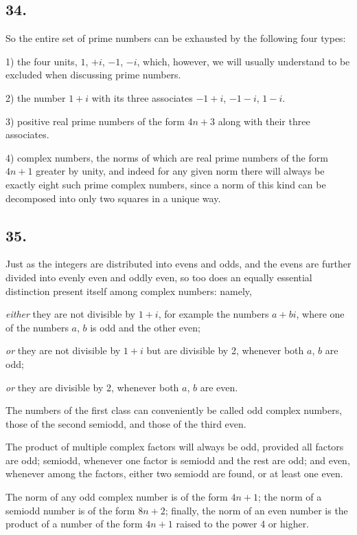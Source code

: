 \documentclass[twoside,12pt, showframe]{memoir}
\begin{document}
\subsection*{34.}

So the entire set of prime numbers can be exhausted by the following four types:

1) the four units, \(1\), \(+i\), \(-1\), \(-i\), which, however, we will usually understand to be excluded when discussing prime numbers.

2) the number \(1+i\) with its three associates \(-1+i\), \(-1-i\), \(1-i\).

3) positive real prime numbers of the form \(4n+3\) along with their three associates.

4) complex numbers, the norms of which are real prime numbers of the form \(4n+1\) greater by unity, and indeed for any given norm there will always be exactly eight such prime complex numbers, since a norm of this kind can be decomposed into only two squares in a unique way.
%

\subsection*{35.}

Just as the integers are distributed into evens and odds, and the evens are further divided into evenly even and oddly even, so too does an equally essential distinction present itself among complex numbers: namely,

\textit{either} they are not divisible by \(1+i\), for example the numbers \(a+bi\), where one of the numbers \(a\), \(b\) is odd and the other even;

\textit{or} they are not divisible by \(1+i\) but are divisible by 2, whenever both \(a\), \(b\) are odd;

\textit{or} they are divisible by 2, whenever both \(a\), \(b\) are even.

The numbers of the first class can conveniently be called odd complex numbers, those of the second semiodd, and those of the third even.

The product of multiple complex factors will always be odd, provided all factors are odd; semiodd, whenever one factor is semiodd and the rest are odd; and even, whenever among the factors, either two semiodd are found, or at least one even.

The norm of any odd complex number is of the form \(4n+1\); the norm of a semiodd number is of the form \(8n+2\); finally, the norm of an even number is the product of a number of the form \(4n+1\) raised to the power 4 or higher.
%
\end{document}
